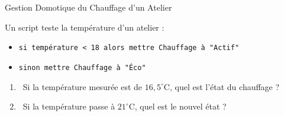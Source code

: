 \begin{exercice}[3 pts][\capSApproprier]{Gestion Domotique du Chauffage d'un Atelier}
\noindent
\begin{minipage}[c]{0.58\linewidth}
Un script teste la température d'un atelier :
\begin{itemize}[leftmargin=1.2em, itemsep=1pt]
    \item \texttt{si température < 18 alors mettre Chauffage à "Actif"}
    \item \texttt{sinon mettre Chauffage à "Éco"}
\end{itemize}
\begin{enumerate}[leftmargin=1.2em, itemsep=1pt]
    \item \capSApproprier\ Si la température mesurée est de $16{,}5^\circ\text{C}$, quel est l'état du chauffage ?
    \item \capValider\ Si la température passe à $21^\circ\text{C}$, quel est le nouvel état ?
\end{enumerate}
\end{minipage}\hfill
\begin{minipage}[c]{0.38\linewidth}
\centering
{}
\end{minipage}

\vspace{1mm}
\lignesreponse[2]
\end{exercice}

\newpage

